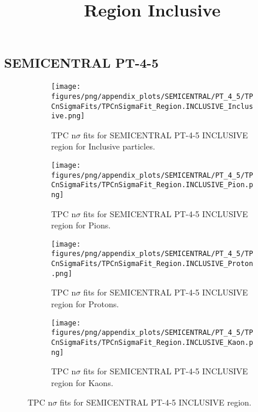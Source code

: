             \subsection{SEMICENTRAL PT-4-5}
            \begin{figure}[H]
                \title{Region Inclusive}
                \begin{subfigure}[b]{0.5\textwidth}
                    \centering
                    \texttt{[image: figures/png/appendix\_plots/SEMICENTRAL/PT\_4\_5/TPCnSigmaFits/TPCnSigmaFit\_Region.INCLUSIVE\_Inclusive.png]}
                    \caption{TPC n$\sigma$ fits for SEMICENTRAL PT-4-5 INCLUSIVE region for Inclusive particles.}
                    \label{fig:appendix_SEMICENTRAL_PT-4-5_INCLUSIVE_Inclusive}
                \end{subfigure}
                \begin{subfigure}[b]{0.5\textwidth}
                    \centering
                    \texttt{[image: figures/png/appendix\_plots/SEMICENTRAL/PT\_4\_5/TPCnSigmaFits/TPCnSigmaFit\_Region.INCLUSIVE\_Pion.png]}
                    \caption{TPC n$\sigma$ fits for SEMICENTRAL PT-4-5 INCLUSIVE region for Pions.}
                    \label{fig:appendix_SEMICENTRAL_PT-4-5_INCLUSIVE_Pion}
                \end{subfigure}
                \begin{subfigure}[b]{0.5\textwidth}
                    \centering
                    \texttt{[image: figures/png/appendix\_plots/SEMICENTRAL/PT\_4\_5/TPCnSigmaFits/TPCnSigmaFit\_Region.INCLUSIVE\_Proton.png]}
                    \caption{TPC n$\sigma$ fits for SEMICENTRAL PT-4-5 INCLUSIVE region for Protons.}
                    \label{fig:appendix_SEMICENTRAL_PT-4-5_INCLUSIVE_Proton}
                \end{subfigure}
                \begin{subfigure}[b]{0.5\textwidth}
                    \centering
                    \texttt{[image: figures/png/appendix\_plots/SEMICENTRAL/PT\_4\_5/TPCnSigmaFits/TPCnSigmaFit\_Region.INCLUSIVE\_Kaon.png]}
                    \caption{TPC n$\sigma$ fits for SEMICENTRAL PT-4-5 INCLUSIVE region for Kaons.}
                    \label{fig:appendix_SEMICENTRAL_PT-4-5_INCLUSIVE_Kaon}
                \end{subfigure}
                \caption{TPC n$\sigma$ fits for SEMICENTRAL PT-4-5 INCLUSIVE region.}
                \label{fig:appendix_SEMICENTRAL_PT-4-5_INCLUSIVE}
            \end{figure}
